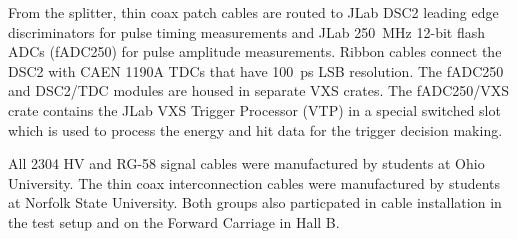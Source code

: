 From the splitter, thin coax patch cables are routed to JLab DSC2 leading edge discriminators for pulse timing measurements and JLab 250~MHz 12-bit flash ADCs (fADC250) for pulse amplitude measurements.  Ribbon cables connect the DSC2 with CAEN 1190A TDCs that have 100~ps LSB resolution. The fADC250 and DSC2/TDC modules are housed in separate VXS crates.  The fADC250/VXS crate contains the JLab VXS Trigger Processor (VTP) in a special switched slot which is used to process the energy and hit data for the trigger decision making.

All 2304 HV and RG-58 signal cables were manufactured by students at Ohio University.  The thin coax interconnection cables were  manufactured by students at Norfolk State University.  Both groups also particpated in cable installation in the test setup and on the Forward Carriage in Hall B.  





